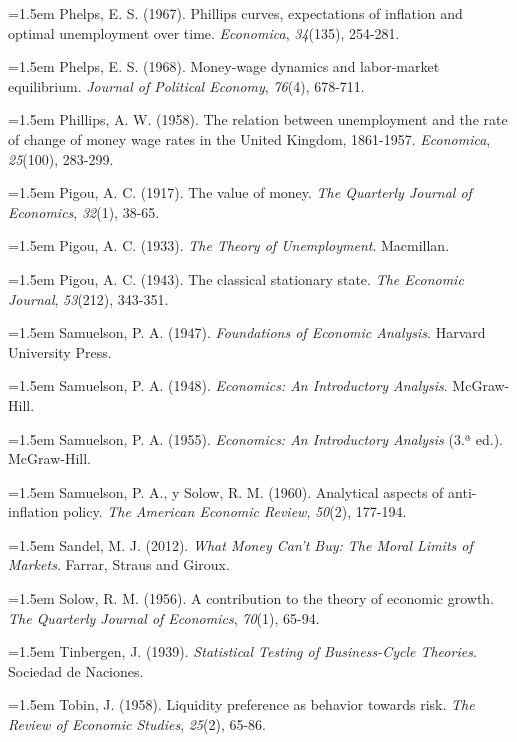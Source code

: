 \documentclass[10pt,a4paper]{article}
\begin{document}
\noindent\hangindent=1.5em Phelps, E. S. (1967). Phillips curves, expectations of inflation and optimal unemployment over time. \textit{Economica}, \textit{34}(135), 254-281.

\noindent\hangindent=1.5em Phelps, E. S. (1968). Money-wage dynamics and labor-market equilibrium. \textit{Journal of Political Economy}, \textit{76}(4), 678-711.

\noindent\hangindent=1.5em Phillips, A. W. (1958). The relation between unemployment and the rate of change of money wage rates in the United Kingdom, 1861-1957. \textit{Economica}, \textit{25}(100), 283-299.

\noindent\hangindent=1.5em Pigou, A. C. (1917). The value of money. \textit{The Quarterly Journal of Economics}, \textit{32}(1), 38-65.

\noindent\hangindent=1.5em Pigou, A. C. (1933). \textit{The Theory of Unemployment}. Macmillan.

\noindent\hangindent=1.5em Pigou, A. C. (1943). The classical stationary state. \textit{The Economic Journal}, \textit{53}(212), 343-351.

\noindent\hangindent=1.5em Samuelson, P. A. (1947). \textit{Foundations of Economic Analysis}. Harvard University Press.

\noindent\hangindent=1.5em Samuelson, P. A. (1948). \textit{Economics: An Introductory Analysis}. McGraw-Hill.

\noindent\hangindent=1.5em Samuelson, P. A. (1955). \textit{Economics: An Introductory Analysis} (3.ª ed.). McGraw-Hill.

\noindent\hangindent=1.5em Samuelson, P. A., y Solow, R. M. (1960). Analytical aspects of anti-inflation policy. \textit{The American Economic Review}, \textit{50}(2), 177-194.

\noindent\hangindent=1.5em Sandel, M. J. (2012). \textit{What Money Can't Buy: The Moral Limits of Markets}. Farrar, Straus and Giroux.

\noindent\hangindent=1.5em Solow, R. M. (1956). A contribution to the theory of economic growth. \textit{The Quarterly Journal of Economics}, \textit{70}(1), 65-94.

\noindent\hangindent=1.5em Tinbergen, J. (1939). \textit{Statistical Testing of Business-Cycle Theories}. Sociedad de Naciones.

\noindent\hangindent=1.5em Tobin, J. (1958). Liquidity preference as behavior towards risk. \textit{The Review of Economic Studies}, \textit{25}(2), 65-86.
\end{document}
